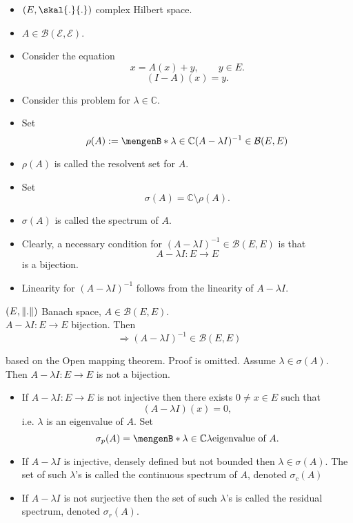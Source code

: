 \begin{itemize}
	\item $(E,\skal{.}{.})$ complex Hilbert space.
	\item $A \in \mathcal{B(E,E)}$. 
	\item Consider the equation
\[
	x = A(x)+ y, \qquad y \in E.
\]
\[
	(I-A)(x)= y.
\]
\item Consider this problem for $\lambda \in \mathbb{C}$. \\
\item Set \[
	\rho(A) := \set[\lambda \in \mathbb{C}]{(A- \lambda I)^{-1} \in \mathcal{B}(E,E)}
\]
\item $\rho(A)$ is called the resolvent set for $A$.
\item Set \[
	\sigma(A) = \mathbb{C} \setminus \rho(A).
\]
\item $\sigma(A)$ is called the spectrum of $A$.
\item Clearly, a necessary condition for $(A-\lambda I)^{-1} \in \mathcal{B}(E,E)$ is that 
\[
	A - \lambda I:E \to E
\]
is a bijection.
\item Linearity for $(A-\lambda I)^{-1}$ follows from the linearity of $A-\lambda I$.

\end{itemize}
\begin{theorem}
	$(E,\norm{.})$ Banach space, $A \in \mathcal{B}(E,E)$. \\$A-\lambda I: E \to E$ bijection. Then
	\[
		\Rightarrow (A- \lambda I)^{-1} \in \mathcal{B}(E,E)
	\]
\end{theorem}
\begin{beweis}
	based on the Open mapping theorem. Proof is omitted. Assume $\lambda \in \sigma(A)$. Then $A-\lambda I:E \to E$ is not a bijection.

\begin{itemize}
	\item If $A-\lambda I: E \to E$ is not injective then there exists $0 \neq x \in  E $ such that
	\[
		(A- \lambda I)(x) = 0,
	\]
	i.e. $\lambda$ is an eigenvalue of $A$.
	Set	
	\[
		\sigma_p(A) = \set[\lambda \in \mathbb{C}]{\lambda \text{eigenvalue of $A$}}.
	\]
	\item If $A-\lambda I$ is injective, densely defined but not bounded then $\lambda \in \sigma(A)$. The set of such $\lambda$'s is called the continuous spectrum of $A$, denoted $\sigma_c(A)$
	\item If $A-\lambda I$ is not surjective then the set of such $\lambda$'s is called the residual spectrum, denoted $\sigma _r(A)$.
\end{itemize}
\end{beweis}
